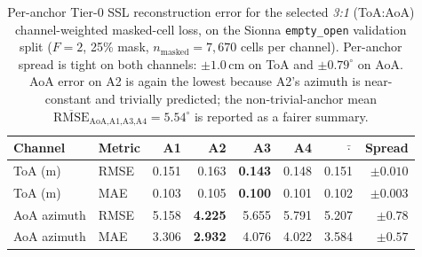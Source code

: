 
\begin{table}[t]
\centering
\caption{Per-anchor Tier-0 SSL reconstruction error for the selected
\emph{3:1} (ToA:AoA) channel-weighted masked-cell loss, on the
Sionna \texttt{empty\_open} validation split ($F{=}2$, 25\% mask,
$n_{\text{masked}}{=}7{,}670$ cells per channel).
Per-anchor spread is tight on both channels: $\pm 1.0$\,cm on ToA
and $\pm 0.79^\circ$ on AoA. AoA error on A2 is again the lowest
because A2's azimuth is near-constant and trivially predicted;
the non-trivial-anchor mean $\overline{\text{RMSE}}_{\text{AoA,A1,A3,A4}}
= 5.54^\circ$ is reported as a fairer summary.}
\label{tab:tier0_3to1_peranchor}
\small
\begin{tabular}{ll rrrr r r}
\toprule
Channel & Metric & {A1} & {A2} & {A3} & {A4} & {$\bar{\cdot}$} & {Spread} \\
\midrule
ToA (m)         & RMSE & 0.151 & 0.163 & \textbf{0.143} & 0.148 & 0.151 & $\pm 0.010$ \\
ToA (m)         & MAE  & 0.103 & 0.105 & \textbf{0.100} & 0.101 & 0.102 & $\pm 0.003$ \\
\addlinespace
AoA azimuth     & RMSE & 5.158 & \textbf{4.225} & 5.655 & 5.791 & 5.207 & $\pm 0.78$ \\
AoA azimuth     & MAE  & 3.306 & \textbf{2.932} & 4.076 & 4.022 & 3.584 & $\pm 0.57$ \\
\bottomrule
\end{tabular}
\end{table}
